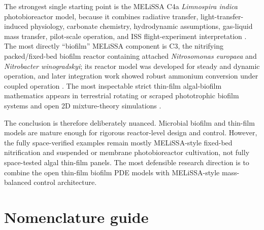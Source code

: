 \documentclass[11pt]{article}
\newcommand{\MEL}{MELiSSA}
\newcommand{\Limno}{\textit{Limnospira indica}}
\newcommand{\Nts}{\textit{Nitrosomonas europaea}}
\newcommand{\Ntb}{\textit{Nitrobacter winogradskyi}}
\begin{document}
The strongest single starting point is the \MEL{} C4a \Limno{} photobioreactor model, because it combines radiative transfer, light-transfer-induced physiology, carbonate chemistry, hydrodynamic assumptions, gas-liquid mass transfer, pilot-scale operation, and ISS flight-experiment interpretation \parencite[1--3, 6, 8--9]{poughon2021}. The most directly ``biofilm'' \MEL{} component is C3, the nitrifying packed/fixed-bed biofilm reactor containing attached \Nts{} and \Ntb{}; its reactor model was developed for steady and dynamic operation, and later integration work showed robust ammonium conversion under coupled operation \parencite[2359--2369]{perez2005}\parencite[2, 11, 13]{garcia2021}. The most inspectable strict thin-film algal-biofilm mathematics appears in terrestrial rotating or scraped phototrophic biofilm systems and open 2D mixture-theory simulations \parencite[1, 3--5]{polizzi2022}\parencite[2436--2445]{blanken2014}.

The conclusion is therefore deliberately nuanced. Microbial biofilm and thin-film models are mature enough for rigorous reactor-level design and control. However, the fully space-verified examples remain mostly \MEL{}-style fixed-bed nitrification and suspended or membrane photobioreactor cultivation, not fully space-tested algal thin-film panels. The most defensible research direction is to combine the open thin-film biofilm PDE models with \MEL{}-style mass-balanced control architecture.

\section{Nomenclature guide}
\end{document}
